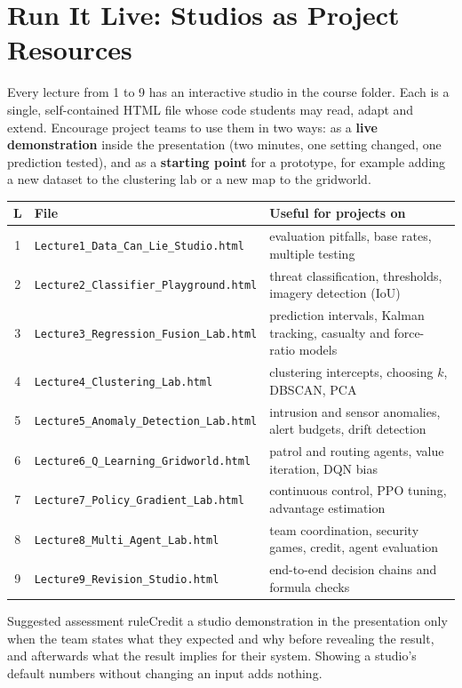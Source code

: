 \documentclass[11pt]{article}
\begin{document}
\section{Run It Live: Studios as Project Resources}\label{sec:live}
Every lecture from 1 to 9 has an interactive studio in the course folder. Each is a single, self-contained HTML file whose code students may read, adapt and extend. Encourage project teams to use them in two ways: as a \textbf{live demonstration} inside the presentation (two minutes, one setting changed, one prediction tested), and as a \textbf{starting point} for a prototype, for example adding a new dataset to the clustering lab or a new map to the gridworld.
\begin{center}\small\renewcommand{\arraystretch}{1.2}\begin{tabularx}{\textwidth}{@{}c l X@{}}\toprule\textbf{L} & \textbf{File} & \textbf{Useful for projects on}\\\midrule
1 & \texttt{Lecture1\_Data\_Can\_Lie\_Studio.html} & evaluation pitfalls, base rates, multiple testing\\
2 & \texttt{Lecture2\_Classifier\_Playground.html} & threat classification, thresholds, imagery detection (IoU)\\
3 & \texttt{Lecture3\_Regression\_Fusion\_Lab.html} & prediction intervals, Kalman tracking, casualty and force-ratio models\\
4 & \texttt{Lecture4\_Clustering\_Lab.html} & clustering intercepts, choosing $k$, DBSCAN, PCA\\
5 & \texttt{Lecture5\_Anomaly\_Detection\_Lab.html} & intrusion and sensor anomalies, alert budgets, drift detection\\
6 & \texttt{Lecture6\_Q\_Learning\_Gridworld.html} & patrol and routing agents, value iteration, DQN bias\\
7 & \texttt{Lecture7\_Policy\_Gradient\_Lab.html} & continuous control, PPO tuning, advantage estimation\\
8 & \texttt{Lecture8\_Multi\_Agent\_Lab.html} & team coordination, security games, credit, agent evaluation\\
9 & \texttt{Lecture9\_Revision\_Studio.html} & end-to-end decision chains and formula checks\\\bottomrule\end{tabularx}\end{center}
\begin{instr}{Suggested assessment rule}Credit a studio demonstration in the presentation only when the team states what they expected and why before revealing the result, and afterwards what the result implies for their system. Showing a studio's default numbers without changing an input adds nothing.\end{instr}
\end{document}
